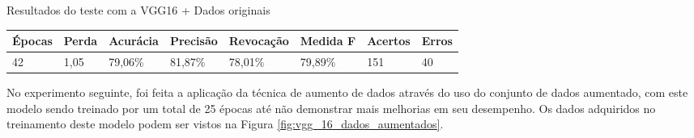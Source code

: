 \documentclass[
	12pt,				%
	oneside,			%
	a4paper,			%
	english,			%
	brazil				%
	]{abntex2ppgsi}
\begin{document}
\begin{quadro}[H]
\caption{Resultados do teste com a VGG16 + Dados originais}
\label{quad:resultados_teste_vgg_16_com_dados_originais}
\centering
\begin{tabular}{|l|l|l|l|l|l|l|l|}
\cline{1-8}
Épocas & Perda & Acurácia & Precisão & Revocação & Medida F & Acertos & Erros \\ \hline
42 & 1,05 & 79,06\% & 81,87\% & 78,01\% & 79,89\% & 151 & 40 \\
\cline{1-8}
\end{tabular}
\end{quadro}

No experimento seguinte, foi feita a aplicação da técnica de aumento de dados através do uso do conjunto de dados aumentado, com este modelo sendo treinado por um total de 25 épocas até não demonstrar mais melhorias em seu desempenho. Os dados adquiridos no treinamento deste modelo podem ser vistos na Figura \ref{fig:vgg_16_dados_aumentados}.
\end{document}
